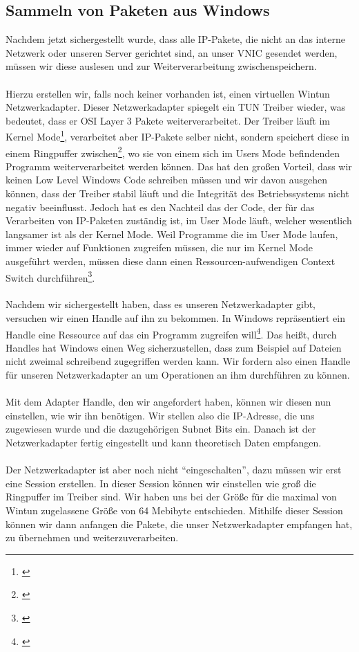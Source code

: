 \subsection{Sammeln von Paketen aus Windows}
Nachdem jetzt sichergestellt wurde, dass alle IP-Pakete, die nicht an das interne Netzwerk oder unseren Server gerichtet sind, an unser VNIC gesendet werden, müssen wir diese auslesen und zur Weiterverarbeitung zwischenspeichern.
\\\\
Hierzu erstellen wir, falls noch keiner vorhanden ist, einen virtuellen Wintun Netzwerkadapter. Dieser Netzwerkadapter spiegelt ein TUN Treiber wieder, was bedeutet, dass er OSI Layer 3 Pakete weiterverarbeitet. Der Treiber läuft im Kernel Mode\footnote[1]{\cite[Vgl.][]{12}}, verarbeitet aber IP-Pakete selber nicht, sondern speichert diese in einem Ringpuffer zwischen\footnote[2]{\cite[Vgl.][]{11}}, wo sie von einem sich im Users Mode befindenden Programm weiterverarbeitet werden können. Das hat den großen Vorteil, dass wir keinen Low Level Windows Code schreiben müssen und wir davon ausgehen können, dass der Treiber stabil läuft und die Integrität des Betriebssystems nicht negativ beeinflusst. Jedoch hat es den Nachteil das der Code, der für das Verarbeiten von IP-Paketen zuständig ist, im User Mode läuft, welcher wesentlich langsamer ist als der Kernel Mode. Weil Programme die im User Mode laufen, immer wieder auf Funktionen zugreifen müssen, die nur im Kernel Mode ausgeführt werden, müssen diese dann einen Ressourcen-aufwendigen Context Switch durchführen\footnote[3]{\cite[Vgl.][]{13}}.
\\\\
Nachdem wir sichergestellt haben, dass es unseren Netzwerkadapter gibt, versuchen wir einen Handle auf ihn zu bekommen. In Windows repräsentiert ein Handle eine Ressource auf das ein Programm zugreifen will\footnote[4]{\cite[Vgl.][]{14}}. Das heißt, durch Handles hat Windows einen Weg sicherzustellen, dass zum Beispiel auf Dateien nicht zweimal schreibend zugegriffen werden kann. Wir fordern also einen Handle für unseren Netzwerkadapter an um Operationen an ihm durchführen zu können.
\\\\
Mit dem Adapter Handle, den wir angefordert haben, können wir diesen nun einstellen, wie wir ihn benötigen. Wir stellen also die IP-Adresse, die uns zugewiesen wurde und die dazugehörigen Subnet Bits ein. Danach ist der Netzwerkadapter fertig eingestellt und kann theoretisch Daten empfangen.
\\\\
Der Netzwerkadapter ist aber noch nicht “eingeschalten”, dazu müssen wir erst eine Session erstellen. In dieser Session können wir einstellen wie groß die Ringpuffer im Treiber sind. Wir haben uns bei der Größe für die maximal von Wintun zugelassene Größe von 64 Mebibyte entschieden. Mithilfe dieser Session können wir dann anfangen die Pakete, die unser Netzwerkadapter empfangen hat, zu übernehmen und weiterzuverarbeiten.

